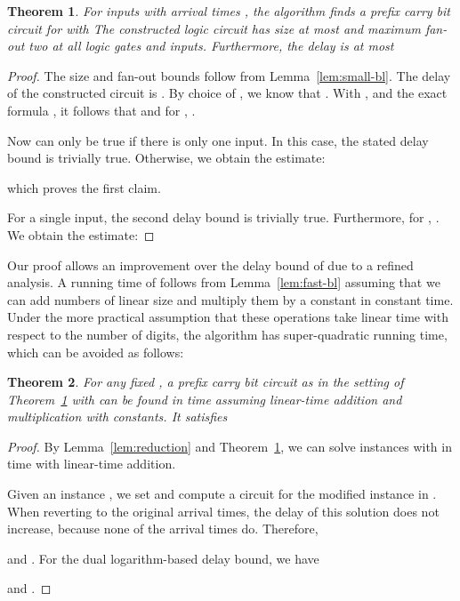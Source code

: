 \documentclass[11pt,final,microtype]{scrartcl}
\theoremstyle{plain}
\newtheorem{theorem}{Theorem}[section]
\theoremstyle{definition}
\theoremstyle{remark}
\begin{document}
\begin{theorem} \label{thm:my-pfx} For  inputs with arrival times
    , the algorithm finds a prefix
    carry bit circuit for  with  
    The constructed logic circuit has size at most  and
    maximum fan-out two at all logic gates and inputs. Furthermore,
    the delay is at most
    
  \end{theorem}
  \begin{proof}
  The size and fan-out bounds follow from Lemma~\ref{lem:small-bl}.
  The delay of the
  constructed circuit is . By choice of , we know that
  . With ,  and the exact formula
  , it follows that
   and for ,
  .

  Now  can only be true if there is only one input. In this
  case, the stated delay bound is trivially true. Otherwise, we obtain
  the estimate:
  
  which proves the first claim. 

  For a single input, the second delay bound is trivially
  true.  Furthermore, for , . We obtain the estimate:
  
\end{proof}

Our proof allows an improvement over the delay bound of \cite{bonn1}
due to a refined analysis.  A running time of 
follows from Lemma~\ref{lem:fast-bl} assuming that we can add numbers
of linear size and multiply them by a constant in constant time.
Under the more practical assumption that these operations take linear
time with respect to the number of digits, the algorithm has
super-quadratic running time, which can be avoided as follows:

\begin{theorem} \label{thm:fast-pfx} For any fixed , a
  prefix carry bit circuit as in the setting of
  Theorem~\ref{thm:my-pfx} with  can be found in  time
  assuming linear-time addition and multiplication with constants.  It
  satisfies
  
\end{theorem}
\begin{proof}
  By Lemma~\ref{lem:reduction} and Theorem~\ref{thm:my-pfx}, we can
  solve instances with 
  in  time with linear-time addition.

  Given an instance , we set  and compute a circuit for the modified
  instance in . When reverting to the original
  arrival times, the delay of this solution does not increase, because
  none of the arrival times do. Therefore, 
  
  and . For the dual logarithm-based delay bound, we
  have
  
  and . 
\end{proof}
\end{document}
